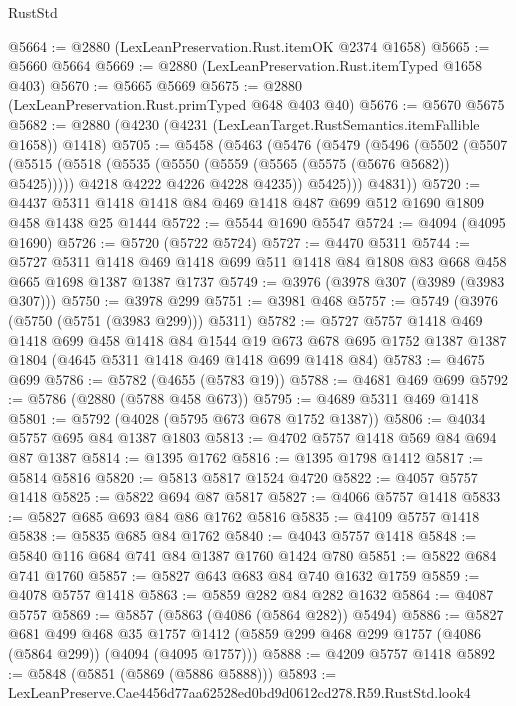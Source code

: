 \begin{lexlean}{RustStd}
\begin{coremodule}
@5664 := @2880 (LexLeanPreservation.Rust.itemOK @2374 @1658)
@5665 := @5660 @5664
@5669 := @2880 (LexLeanPreservation.Rust.itemTyped @1658 @403)
@5670 := @5665 @5669
@5675 := @2880 (LexLeanPreservation.Rust.primTyped @648 @403 @40)
@5676 := @5670 @5675
@5682 := @2880 (@4230 (@4231 (LexLeanTarget.RustSemantics.itemFallible @1658)) @1418)
@5705 := @5458
    (@5463
      (@5476
        (@5479
          (@5496
            (@5502
              (@5507
                (@5515
                  (@5518 (@5535 (@5550 (@5559 (@5565 (@5575 (@5676 @5682)) @5425)))))
                  @4218
                  @4222
                  @4226
                  @4228
                  @4235))
              @5425)))
        @4831))
@5720 := @4437 @5311 @1418 @1418 @84 @469 @1418 @487 @699 @512 @1690 @1809 @458 @1438 @25 @1444
@5722 := @5544 @1690 @5547
@5724 := @4094 (@4095 @1690)
@5726 := @5720 (@5722 @5724)
@5727 := @4470 @5311
@5744 := @5727
    @5311
    @1418
    @469
    @1418
    @699
    @511
    @1418
    @84
    @1808
    @83
    @668
    @458
    @665
    @1698
    @1387
    @1387
    @1737
@5749 := @3976 (@3978 @307 (@3989 (@3983 @307)))
@5750 := @3978 @299
@5751 := @3981 @468
@5757 := @5749 (@3976 (@5750 (@5751 (@3983 @299))) @5311)
@5782 := @5727
    @5757
    @1418
    @469
    @1418
    @699
    @458
    @1418
    @84
    @1544
    @19
    @673
    @678
    @695
    @1752
    @1387
    @1387
    @1804
    (@4645 @5311 @1418 @469 @1418 @699 @1418 @84)
@5783 := @4675 @699
@5786 := @5782 (@4655 (@5783 @19))
@5788 := @4681 @469 @699
@5792 := @5786 (@2880 (@5788 @458 @673))
@5795 := @4689 @5311 @469 @1418
@5801 := @5792 (@4028 (@5795 @673 @678 @1752 @1387))
@5806 := @4034 @5757 @695 @84 @1387 @1803
@5813 := @4702 @5757 @1418 @569 @84 @694 @87 @1387
@5814 := @1395 @1762
@5816 := @1395 @1798 @1412
@5817 := @5814 @5816
@5820 := @5813 @5817 @1524 @4720
@5822 := @4057 @5757 @1418
@5825 := @5822 @694 @87 @5817
@5827 := @4066 @5757 @1418
@5833 := @5827 @685 @693 @84 @86 @1762 @5816
@5835 := @4109 @5757 @1418
@5838 := @5835 @685 @84 @1762
@5840 := @4043 @5757 @1418
@5848 := @5840 @116 @684 @741 @84 @1387 @1760 @1424 @780
@5851 := @5822 @684 @741 @1760
@5857 := @5827 @643 @683 @84 @740 @1632 @1759
@5859 := @4078 @5757 @1418
@5863 := @5859 @282 @84 @282 @1632
@5864 := @4087 @5757
@5869 := @5857 (@5863 (@4086 (@5864 @282)) @5494)
@5886 := @5827
    @681
    @499
    @468
    @35
    @1757
    @1412
    (@5859 @299 @468 @299 @1757 (@4086 (@5864 @299)) (@4094 (@4095 @1757)))
@5888 := @4209 @5757 @1418
@5892 := @5848 (@5851 (@5869 (@5886 @5888)))
@5893 := LexLeanPreserve.Cae4456d77aa62528ed0bd9d0612cd278.R59.RustStd.look4

\end{coremodule}
\end{lexlean}
